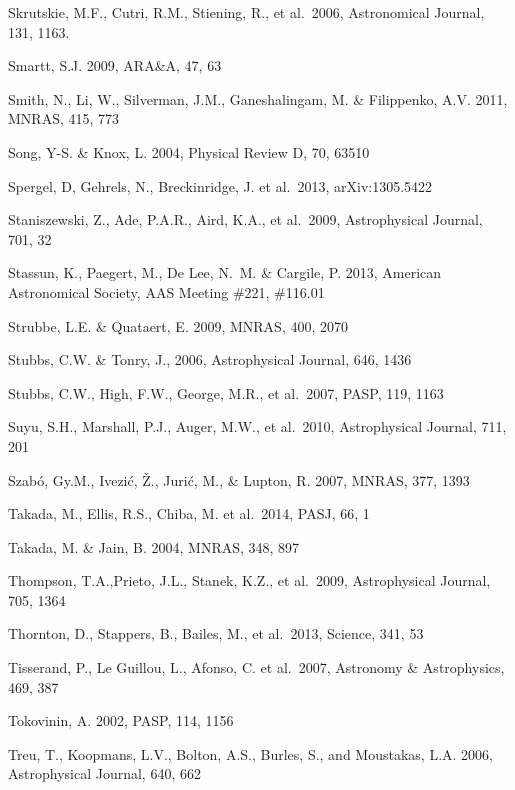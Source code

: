 \documentclass{emulateapj}
\begin{document}
\begin{thebibliography}{}
\bibitem[()]{} Skrutskie, M.F., Cutri, R.M., Stiening, R., et al.~2006, Astronomical Journal, 131, 1163.

\bibitem[()]{} Smartt, S.J. 2009, ARA\&A, 47, 63

\bibitem[()]{} Smith, N., Li, W., Silverman, J.M., Ganeshalingam, M. \& Filippenko, A.V. 2011, MNRAS, 415, 773

\bibitem[()]{} Song, Y-S. \& Knox, L. 2004, Physical Review D, 70, 63510

\bibitem[()]{} Spergel, D, Gehrels, N., Breckinridge, J. et al.~2013, arXiv:1305.5422


\bibitem[()]{} Staniszewski, Z., Ade, P.A.R., Aird, K.A., et al.~2009,  Astrophysical  Journal, 701, 32

\bibitem[()]{} Stassun, K., Paegert, M., De Lee, N.~M. \& Cargile, P. 2013, American Astronomical Society, 
                      AAS Meeting \#221, \#116.01

\bibitem[()]{} Strubbe, L.E. \& Quataert, E. 2009, MNRAS, 400, 2070

\bibitem[()]{} Stubbs, C.W. \& Tonry, J., 2006, Astrophysical Journal, 646, 1436

\bibitem[()]{} Stubbs, C.W., High, F.W., George, M.R., et al.~2007, PASP, 119, 1163 

\bibitem[()]{} Suyu, S.H., Marshall, P.J., Auger, M.W., et al.~2010, Astrophysical Journal, 711, 201

\bibitem[()]{} Szab\'o, Gy.M., Ivezi\'c, \v{Z}., Juri\'c, M., \& Lupton, R. 2007, MNRAS, 377, 1393

\bibitem[()]{} Takada, M., Ellis, R.S., Chiba, M. et al.~2014, PASJ,
  66, 1

\bibitem[()]{} Takada, M. \& Jain, B. 2004, MNRAS, 348, 897

\bibitem[()]{} Thompson, T.A.,Prieto, J.L., Stanek, K.Z., et al.~2009, Astrophysical Journal, 705, 1364

\bibitem[()]{} Thornton, D., Stappers, B., Bailes, M., et al.~2013, Science, 341, 53

\bibitem[()]{} Tisserand, P., Le Guillou, L., Afonso, C. et al.~2007, Astronomy \& Astrophysics, 469, 387

\bibitem[()]{} Tokovinin, A. 2002, PASP, 114, 1156

\bibitem[()]{} Treu, T., Koopmans, L.V., Bolton, A.S., Burles, S., and
  Moustakas, L.A. 2006, Astrophysical Journal, 640, 662


\end{thebibliography}
\end{document}
